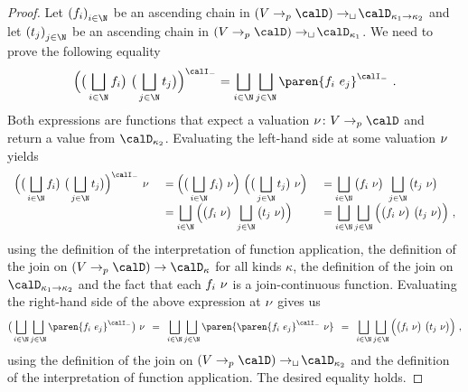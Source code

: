 \documentclass[../../diss.tex]{subfiles}
\begin{document}
\begin{proof}
    Let ${(f_i)}_{i \in \N}$ be an ascending chain in $(V \pto \domain) \cto \domain{\kappa_1 \to \kappa_2}$ and let ${(t_j)}_{j \in \N}$ be an ascending chain in $(V \pto \domain) \cto \domain{\kappa_1}$.
    We need to prove the following equality
    \[
        {\Big(
            \big( \bigsqcup_{i \in \N} f_i \big)
            \appl
            \big( \bigsqcup_{j \in \N} t_j \big)
        \Big)}^\interpretationt
        =
        \bigsqcup_{i \in \N}
        \bigsqcup_{j \in \N}
        {\paren{ f_i \appl e_j}}^\interpretationt
        \ .
    \]
    Both expressions are functions that expect a valuation $\val \colon V \pto \domain$ and return a value from $\domain{\kappa_2}$.
    Evaluating the left-hand side at some valuation $\nu$ yields
    \[
        \begin{array}{>{\displaystyle}r>{\displaystyle\enspace}l>{\displaystyle\enspace}l}
        {\Big(
            \big( \bigsqcup_{i \in \N} f_i \big)
            \appl
            \big( \bigsqcup_{j \in \N} t_j \big)
        \Big)}^\interpretationt
        \appl \val
        &=
        \Big( \big( \bigsqcup_{i \in \N} f_i \big) \appl \val \Big)
        \appl
        \Big(  \big( \bigsqcup_{j \in \N} t_j \big) \appl\val \Big)
        &=
        \bigsqcup_{i \in \N} \big( f_i \appl \val \big)
        \appl
        \bigsqcup_{j \in \N} \big( t_j \appl \val \big)
        \\
        &=
        \bigsqcup_{i \in \N}
        \Big(
            \big( f_i \appl \val \big)
            \appl
            \bigsqcup_{j \in \N} \big( t_j \appl \val \big)
        \Big)
        &=
        \bigsqcup_{i \in \N}
        \bigsqcup_{j \in \N}
        \Big(
            \big( f_i \appl \val \big)
            \appl
            \big( t_j \appl \val \big)
        \Big)
        \ ,
        \end{array}
    \]
    using the definition of the interpretation of function application,
    the definition of the join on $(V \pto \domain) \to \domain{\kappa}$ for all kinds $\kappa$,
    the definition of the join on $\domain{\kappa_1 \to \kappa_2}$
    and the fact that each $f_i \  \nu$ is a join-continuous function.
    Evaluating the right-hand side of the above expression at $\nu$ gives us
    \[
        \big(
            \bigsqcup_{i \in \N}
            \bigsqcup_{j \in \N}
            {\paren{ f_i \appl e_j}}^\interpretationt
        \big)
        \appl
        \val
        \enspace = \enspace
        \bigsqcup_{i \in \N}
        \bigsqcup_{j \in \N}
        \paren{
            {\paren{ f_i \appl e_j}}^\interpretationt
            \appl
            \val
        }
        \enspace = \enspace
        \bigsqcup_{i \in \N}
        \bigsqcup_{j \in \N}
        \Big(
            \big( f_i \appl \val \big)
            \appl
            \big( t_j \appl \val \big)
        \Big)
        \ ,
    \]
    using the definition of the join on $(V \pto \domain) \cto \domain{\kappa_2}$ and the definition of the interpretation of function application.
    The desired equality holds.
\end{proof}
\end{document}
